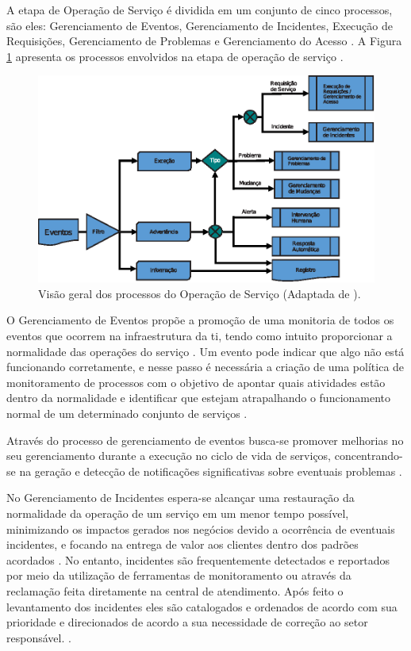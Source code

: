 A etapa de Operação de Serviço é dividida em um conjunto de cinco processos, são eles: Gerenciamento de Eventos, Gerenciamento de Incidentes, Execução de Requisições, Gerenciamento de Problemas e Gerenciamento do Acesso \cite{serviceoperation, abreu2012implantando}. A Figura \ref{relacao-processos-service-operation} apresenta os processos envolvidos na etapa de operação de serviço \cite{abreu2012implantando}.

\begin{figure}[!h]
  \centering
  \includegraphics[width=.80\textwidth]{figuras/processos-service-operation.eps} 
  \caption{Visão geral dos processos do Operação de Serviço (Adaptada de \cite{abreu2012implantando, serviceoperation}).}
  \label{relacao-processos-service-operation} 
\end{figure}

O Gerenciamento de Eventos propõe a promoção de uma monitoria de todos os eventos que ocorrem na infraestrutura da \acrshort{ti}, tendo como intuito proporcionar a normalidade das operações do serviço \cite{abreu2012implantando}. Um evento pode indicar que algo não está funcionando corretamente, e nesse passo é necessária a criação de uma política de monitoramento de processos com o objetivo de apontar quais atividades estão dentro da normalidade e identificar que estejam atrapalhando o funcionamento normal de um determinado conjunto de serviços \cite{introductoryoverviewofitil}. 

Através do processo de gerenciamento de eventos busca-se promover melhorias no seu gerenciamento durante a execução no ciclo de vida de serviços, concentrando-se na geração e detecção de notificações significativas sobre eventuais problemas \cite{introductoryoverviewofitil}.

No Gerenciamento de Incidentes espera-se alcançar uma restauração da normalidade da operação de um serviço em um menor tempo possível, minimizando os impactos gerados nos negócios devido a ocorrência de eventuais incidentes, e focando na entrega de valor aos clientes dentro dos padrões acordados \cite{abreu2012implantando}. No entanto, incidentes são frequentemente detectados e reportados por meio da utilização de ferramentas de monitoramento ou através da reclamação feita diretamente na central de atendimento. Após feito o levantamento dos incidentes eles são catalogados e ordenados de acordo com sua prioridade e direcionados de acordo a sua necessidade de correção ao setor responsável. \cite{introductoryoverviewofitil}.

